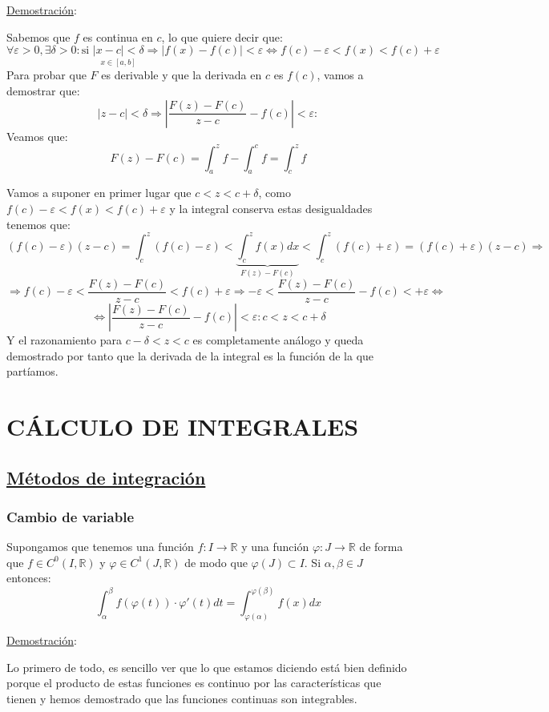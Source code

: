 \documentclass[10pt,a4paper,openright]{book}
\begin{document}
\underline{Demostración}:

Sabemos que $f$ es continua en $c$, lo que quiere decir que:
$$\forall \varepsilon > 0, \exists \delta > 0: \mbox{si }  \underset {x \in [a,b]}{|x-c|<\delta} \Rightarrow |f(x) - f(c)|<\varepsilon  \Leftrightarrow
 f(c)-\varepsilon < f(x)<f(c)+ \varepsilon$$
Para probar que $F$ es derivable y que la derivada en $c$ es $f(c)$, vamos a demostrar que:
$$|z-c|<\delta \Rightarrow \left| \frac{F(z) - F(c)}{z-c} - f(c) \right| < \varepsilon: $$
Veamos que:
$$F(z) - F(c) =  \int_{a}^{z} f - \int_{a}^{c} f = \int_{c}^{z} f$$

Vamos a suponer en primer lugar que $c<z<c+\delta$, como $f(c)-\varepsilon < f(x)<f(c)+ \varepsilon$ y la integral conserva estas desigualdades tenemos que:
$$(f(c) - \varepsilon)(z-c) = \int_{c}^{z} (f(c)-\varepsilon) < \underbrace{\int_{c}^{z} f(x)dx}_{F(z) - F(c)} < \int_{c}^{z} (f(c)+\varepsilon) = (f(c) + \varepsilon)(z-c) \Rightarrow  $$
$$\Rightarrow f(c) - \varepsilon < \frac{F(z) - F(c)}{z-c} < f(c) + \varepsilon \Rightarrow - \varepsilon < \frac{F(z) - F(c)}{z-c} - f(c) < + \varepsilon \Leftrightarrow$$
$$\Leftrightarrow \left| \frac{F(z) - F(c)}{z-c} - f(c) \right| < \varepsilon: c < z < c+\delta$$
Y el razonamiento para $c-\delta < z <c$ es completamente análogo y queda demostrado por tanto que la derivada de la integral es la función de la que partíamos.

\section*{CÁLCULO DE INTEGRALES}
\subsection*{\underline{Métodos de integración}}
\subsubsection*{Cambio de variable}
Supongamos que tenemos una función $f:I\rightarrow \mathbb R$ y una función $\varphi: J\rightarrow \mathbb R$ de forma que $f\in C^0(I,\mathbb R)$ y $\varphi\in C^1(J,\mathbb R)$ de modo que $\varphi(J)\subset I$. Si $\alpha,\beta\in J$ entonces:
$$\int_{\alpha}^{\beta} f(\varphi(t))\cdot \varphi'(t)dt = \int_{\varphi(\alpha)}^{\varphi(\beta)} f(x)dx$$

\underline{Demostración}:

Lo primero de todo, es sencillo ver que lo que estamos diciendo está bien definido porque el producto de estas funciones es continuo por las características que tienen y hemos demostrado que las funciones continuas son integrables.
\end{document}
